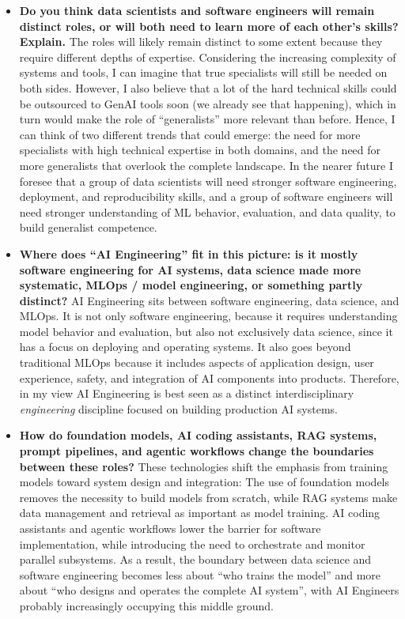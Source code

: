 \documentclass[11pt]{article}
\begin{document}
\begin{itemize}
\item \textbf{Do you think data scientists and software engineers will remain distinct roles, or will both need to learn more of each other’s skills? Explain.}
The roles will likely remain distinct to some extent because they require different depths of expertise. Considering the increasing complexity of systems and tools, I can imagine that true specialists will still be needed on both sides. However, I also believe that a lot of the hard technical skills could be outsourced to GenAI tools soon (we already see that happening), which in turn would make the role of ``generalists'' more relevant than before. Hence, I can think of two different trends that could emerge: the need for more specialists with high technical expertise in both domains, and the need for more generalists that overlook the complete landscape. In the nearer future I foresee that a group of data scientists will need stronger software engineering, deployment, and reproducibility skills, and a group of software engineers will need stronger understanding of ML behavior, evaluation, and data quality, to build generalist competence. 

\item \textbf{Where does “AI Engineering” fit in this picture: is it mostly software engineering for AI systems, data science made more systematic, MLOps / model engineering, or something partly distinct?}
AI Engineering sits between software engineering, data science, and MLOps. It is not only software engineering, because it requires understanding model behavior and evaluation, but also not exclusively data science, since it has a focus on deploying and operating systems. It also goes beyond traditional MLOps because it includes aspects of application design, user experience, safety, and integration of AI components into products. Therefore, in my view AI Engineering is best seen as a distinct interdisciplinary \emph{engineering} discipline focused on building production AI systems.

\item \textbf{How do foundation models, AI coding assistants, RAG systems, prompt pipelines, and agentic workflows change the boundaries between these roles?}
These technologies shift the emphasis from training models toward system design and integration: The use of foundation models removes the necessity to build models from scratch, while RAG systems make data management and retrieval as important as model training. AI coding assistants and agentic workflows lower the barrier for software implementation, while introducing the need to orchestrate and monitor parallel subsystems. As a result, the boundary between data science and software engineering becomes less about ``who trains the model'' and more about ``who designs and operates the complete AI system'', with AI Engineers probably increasingly occupying this middle ground. 

\end{itemize}
\end{document}
